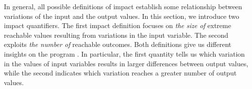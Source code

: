 In general, all possible definitions of impact establish some relationship between variations of the input and the output values.
In this section, we introduce two impact quantifiers.
The first impact definition focuses on \textit{the size of} extreme reachable values resulting from variations in the input variable.
The second exploits \textit{the number of} reachable outcomes.
Both definitions give us different insights on the program \landingprogram.
In particular, the first quantity tells us which variation in the values of input variables results in larger differences between output values, while the second indicates which variation reaches a greater number of output values.

\newcommand*{\highlight}[1]{\textcolor{seabornBlue}{#1}}
\newcommand*{\inputa}{\tuple{-4}{1}}
\newcommand*{\inputax}{\tuple{\highlight{-4}}{1}}
\newcommand*{\inputay}{\tuple{-4}{\highlight{1}}}
\newcommand*{\outputa}{\langle \outputvaluea\rangle} \newcommand*{\outputvaluea}{3}
\newcommand*{\inputb}{\tuple{-4}{2}}
\newcommand*{\inputbx}{\tuple{\highlight{-4}}{2}}
\newcommand*{\inputby}{\tuple{-4}{\highlight{2}}}
\newcommand*{\outputb}{\langle \outputvalueb\rangle} \newcommand*{\outputvalueb}{3}
\newcommand*{\inputc}{\tuple{-4}{3}}
\newcommand*{\inputcx}{\tuple{\highlight{-4}}{3}}
\newcommand*{\inputcy}{\tuple{-4}{\highlight{3}}}
\newcommand*{\outputc}{\langle \outputvaluec\rangle} \newcommand*{\outputvaluec}{3}
\newcommand*{\inputd}{\tuple{ 1}{1}}
\newcommand*{\inputdx}{\tuple{\highlight{ 1}}{1}}
\newcommand*{\inputdy}{\tuple{ 1}{\highlight{1}}}
\newcommand*{\outputd}{\langle \outputvalued\rangle} \newcommand*{\outputvalued}{0}
\newcommand*{\inpute}{\tuple{ 1}{2}}
\newcommand*{\inputex}{\tuple{\highlight{ 1}}{2}}
\newcommand*{\inputey}{\tuple{ 1}{\highlight{2}}}
\newcommand*{\outpute}{\langle \outputvaluee\rangle} \newcommand*{\outputvaluee}{1}
\newcommand*{\inputf}{\tuple{ 1}{3}}
\newcommand*{\inputfx}{\tuple{\highlight{ 1}}{3}}
\newcommand*{\inputfy}{\tuple{ 1}{\highlight{3}}}
\newcommand*{\outputf}{\langle \outputvaluef\rangle} \newcommand*{\outputvaluef}{2}
\newcommand*{\tracea}{\inputa\to\outputa}
\newcommand*{\traceax}{\inputax\to\outputa}
\newcommand*{\traceay}{\inputay\to\outputa}
\newcommand*{\traceb}{\inputb\to\outputb}
\newcommand*{\tracebx}{\inputbx\to\outputb}
\newcommand*{\traceby}{\inputby\to\outputb}
\newcommand*{\tracec}{\inputc\to\outputc}
\newcommand*{\tracecx}{\inputcx\to\outputc}
\newcommand*{\tracecy}{\inputcy\to\outputc}
\newcommand*{\traced}{\inputd\to\outputd}
\newcommand*{\tracedx}{\inputdx\to\outputd}
\newcommand*{\tracedy}{\inputdy\to\outputd}
\newcommand*{\tracee}{\inpute\to\outpute}
\newcommand*{\traceex}{\inputex\to\outpute}
\newcommand*{\traceey}{\inputey\to\outpute}
\newcommand*{\tracef}{\inputf\to\outputf}
\newcommand*{\tracefx}{\inputfx\to\outputf}
\newcommand*{\tracefy}{\inputfy\to\outputf}

